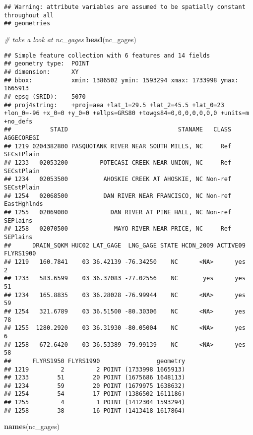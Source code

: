 \documentclass[]{article}
\newenvironment{Shaded}{\begin{snugshade}}{\end{snugshade}}
\newcommand{\KeywordTok}[1]{\textcolor[rgb]{0.13,0.29,0.53}{\textbf{#1}}}
\newcommand{\CommentTok}[1]{\textcolor[rgb]{0.56,0.35,0.01}{\textit{#1}}}
\newcommand{\NormalTok}[1]{#1}
\begin{document}
\begin{verbatim}
## Warning: attribute variables are assumed to be spatially constant throughout all
## geometries
\end{verbatim}

\begin{Shaded}
\begin{Highlighting}[]
\CommentTok{# take a look at nc_gages}
\KeywordTok{head}\NormalTok{(nc_gages)}
\end{Highlighting}
\end{Shaded}

\begin{verbatim}
## Simple feature collection with 6 features and 14 fields
## geometry type:  POINT
## dimension:      XY
## bbox:           xmin: 1386502 ymin: 1593294 xmax: 1733998 ymax: 1665913
## epsg (SRID):    5070
## proj4string:    +proj=aea +lat_1=29.5 +lat_2=45.5 +lat_0=23 +lon_0=-96 +x_0=0 +y_0=0 +ellps=GRS80 +towgs84=0,0,0,0,0,0,0 +units=m +no_defs
##           STAID                               STANAME   CLASS  AGGECOREGI
## 1219 0204382800 PASQUOTANK RIVER NEAR SOUTH MILLS, NC     Ref  SECstPlain
## 1233   02053200         POTECASI CREEK NEAR UNION, NC     Ref  SECstPlain
## 1234   02053500          AHOSKIE CREEK AT AHOSKIE, NC Non-ref  SECstPlain
## 1254   02068500          DAN RIVER NEAR FRANCISCO, NC Non-ref EastHghlnds
## 1255   02069000            DAN RIVER AT PINE HALL, NC Non-ref    SEPlains
## 1258   02070500             MAYO RIVER NEAR PRICE, NC     Ref    SEPlains
##      DRAIN_SQKM HUC02 LAT_GAGE  LNG_GAGE STATE HCDN_2009 ACTIVE09 FLYRS1900
## 1219   160.7841    03 36.42139 -76.34250    NC      <NA>      yes         2
## 1233   583.6599    03 36.37083 -77.02556    NC       yes      yes        51
## 1234   165.8835    03 36.28028 -76.99944    NC      <NA>      yes        59
## 1254   321.6789    03 36.51500 -80.30306    NC      <NA>      yes        78
## 1255  1280.2920    03 36.31930 -80.05004    NC      <NA>      yes         6
## 1258   672.6420    03 36.53389 -79.99139    NC      <NA>      yes        58
##      FLYRS1950 FLYRS1990                geometry
## 1219         2         2 POINT (1733998 1665913)
## 1233        51        20 POINT (1675686 1648113)
## 1234        59        20 POINT (1679975 1638632)
## 1254        54        17 POINT (1386502 1611186)
## 1255         4         1 POINT (1412304 1593294)
## 1258        38        16 POINT (1413418 1617864)
\end{verbatim}

\begin{Shaded}
\begin{Highlighting}[]
\KeywordTok{names}\NormalTok{(nc_gages)}
\end{Highlighting}
\end{Shaded}
\end{document}
